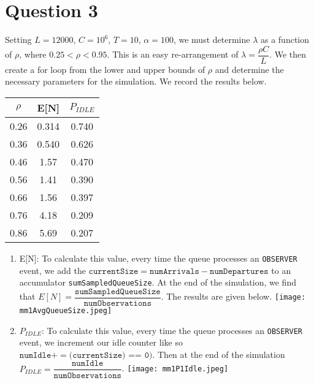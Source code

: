 \documentclass{article}
\begin{document}
\section{Question 3}

Setting $L=12000$, $C=10^6$, $T = 10$, $\alpha = 100$, we must determine $\lambda$ as a function of $\rho$, where $0.25 < \rho < 0.95$.
This is an easy re-arrangement of $\lambda = \dfrac{\rho C}{L}$. We then create a for loop from the lower and upper bounds of $\rho$ and determine
the necessary parameters for the simulation. We record the results below.

\begin{center}
    \begin{tabular}{||c c c||}
    \hline
    $\rho$ & E[N] & $P_{IDLE}$ \\ [0.5ex]
    \hline\hline
    0.26 & 0.314 & 0.740 \\
    \hline
    0.36 & 0.540 & 0.626  \\
    \hline
    0.46 & 1.57 & 0.470  \\
    \hline
    0.56 & 1.41 & 0.390  \\
    \hline
    0.66 & 1.56 & 0.397  \\ [1ex]
    \hline
    0.76 & 4.18 & 0.209  \\ [1ex]
    \hline
    0.86 & 5.69 & 0.207  \\ [1ex]
    \hline
    \end{tabular}
\end{center}

\begin{enumerate}
    \item E[N]: To calculate this value, every time the queue processes an \texttt{OBSERVER} event, we add the
        $\texttt{currentSize} = \texttt{numArrivals} - \texttt{numDepartures}$
        to an accumulator \texttt{sumSampledQueueSize}. At the end of the simulation, we find that $E[N] =
        \dfrac{\texttt{sumSampledQueueSize}}{\texttt{numObservations}}$. The results are given below. \newline
    \texttt{[image: mm1AvgQueueSize.jpeg]}

    \item $P_{IDLE}$: To calculate this value, every time the queue processes an \texttt{OBSERVER} event, we increment our idle counter like so
    $\texttt{numIdle} += (\texttt{currentSize) == 0)}$. Then at the end of the simulation $P_{IDLE} = \dfrac{\texttt{numIdle}}{\texttt{numObservations}}$. \newline
    \texttt{[image: mm1P1Idle.jpeg]}
\end{enumerate}
\end{document}
